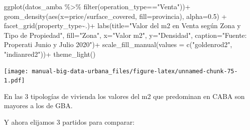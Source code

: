 \documentclass[
  spanish,
]{book}
\newenvironment{Shaded}{\begin{snugshade}}{\end{snugshade}}
\newcommand{\AttributeTok}[1]{\textcolor[rgb]{0.77,0.63,0.00}{#1}}
\newcommand{\FloatTok}[1]{\textcolor[rgb]{0.00,0.00,0.81}{#1}}
\newcommand{\FunctionTok}[1]{\textcolor[rgb]{0.00,0.00,0.00}{#1}}
\newcommand{\NormalTok}[1]{#1}
\newcommand{\SpecialCharTok}[1]{\textcolor[rgb]{0.00,0.00,0.00}{#1}}
\newcommand{\StringTok}[1]{\textcolor[rgb]{0.31,0.60,0.02}{#1}}
\begin{document}
\begin{Shaded}
\begin{Highlighting}[]
\FunctionTok{ggplot}\NormalTok{(datos\_amba }\SpecialCharTok{\%\textgreater{}\%}
         \FunctionTok{filter}\NormalTok{(operation\_type}\SpecialCharTok{==}\StringTok{"Venta"}\NormalTok{))}\SpecialCharTok{+}
  \FunctionTok{geom\_density}\NormalTok{(}\FunctionTok{aes}\NormalTok{(}\AttributeTok{x=}\NormalTok{price}\SpecialCharTok{/}\NormalTok{surface\_covered, }\AttributeTok{fill=}\NormalTok{provincia), }\AttributeTok{alpha=}\FloatTok{0.5}\NormalTok{) }\SpecialCharTok{+}
  \FunctionTok{facet\_grid}\NormalTok{(property\_type}\SpecialCharTok{\textasciitilde{}}\NormalTok{.)}\SpecialCharTok{+}
  \FunctionTok{labs}\NormalTok{(}\AttributeTok{title=}\StringTok{"Valor del m2 en Venta según Zona y Tipo de Propiedad"}\NormalTok{,}
       \AttributeTok{fill=}\StringTok{"Zona"}\NormalTok{,}
       \AttributeTok{x=}\StringTok{"Valor m2"}\NormalTok{,}
       \AttributeTok{y=}\StringTok{"Densidad"}\NormalTok{,}
       \AttributeTok{caption=}\StringTok{"Fuente: Properati Junio y Julio 2020"}\NormalTok{)}\SpecialCharTok{+}
  \FunctionTok{scale\_fill\_manual}\NormalTok{(}\AttributeTok{values =} \FunctionTok{c}\NormalTok{(}\StringTok{"goldenrod2"}\NormalTok{, }\StringTok{"indianred2"}\NormalTok{))}\SpecialCharTok{+}
  \FunctionTok{theme\_light}\NormalTok{()}
\end{Highlighting}
\end{Shaded}

\texttt{[image: manual-big-data-urbana\_files/figure-latex/unnamed-chunk-75-1.pdf]}

En las 3 tipologías de vivienda los valores del m2 que predominan en CABA son mayores a los de GBA.

Y ahora elijamos 3 partidos para comparar:
\end{document}

